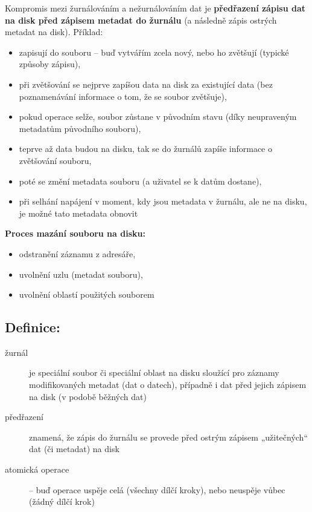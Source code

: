 \documentclass[a4paper, 11pt]{article}
\begin{document}
Kompromis mezi žurnálováním a nežurnálováním dat je \textbf{předřazení zápisu dat na disk před zápisem metadat do žurnálu} (a následně zápis ostrých metadat na disk). Příklad:
\begin{itemize}
    \item zapisují do souboru -- buď vytvářím zcela nový, nebo ho zvětšují (typické způsoby zápisu),
    \item při zvětšování se nejprve zapíšou data na disk za existující data (bez poznamenávání informace o tom, že se soubor zvětšuje),
    \item pokud operace selže, soubor zůstane v původním stavu (díky neupraveným metadatům původního souboru),
    \item teprve až data budou na disku, tak se do žurnálů zapíše informace o zvětšování souboru,
    \item poté se změní metadata souboru (a uživatel se k datům dostane),
    \item při selhání napájení v moment, kdy jsou metadata v žurnálu, ale ne na disku, je možné tato metadata obnovit
\end{itemize}
 
\textbf{Proces mazání souboru na disku:}
\begin{itemize}
    \item odstranění záznamu z adresáře,
    \item uvolnění uzlu (metadat souboru),
    \item uvolnění oblastí použitých souborem
\end{itemize}

\subsection*{Definice:}
\begin{description}
\item[žurnál] je speciální soubor či speciální oblast na disku sloužící pro záznamy modifikovaných metadat (dat o datech), případně i dat před jejich zápisem na disk (v podobě běžných dat)
\item[předřazení] znamená, že zápis do žurnálu se provede před ostrým zápisem „užitečných“ dat (či metadat) na disk
\item[atomická operace] -- buď operace uspěje celá (všechny dílčí kroky), nebo neuspěje vůbec (žádný dílčí krok)
\end{description}
\end{document}

